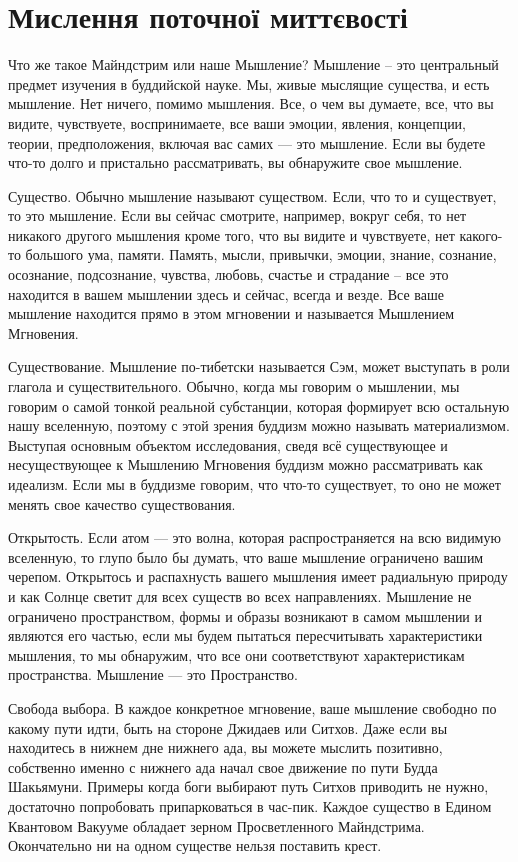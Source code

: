 \section{Мислення поточної миттєвості}

Что же такое Майндстрим или наше Мышление? Мышление – это центральный предмет изучения в буддийской науке. Мы, живые мыслящие существа, и есть мышление. Нет ничего, помимо мышления.  Все, о чем вы думаете, все, что вы видите, чувствуете, воспринимаете, все ваши эмоции, явления, концепции, теории, предположения, включая вас самих — это мышление. Если вы будете что-то долго и пристально рассматривать, вы обнаружите свое мышление. 

Существо. Обычно мышление называют существом. Если, что то и существует, то это мышление. Если вы сейчас смотрите, например, вокруг себя, то нет никакого другого мышления кроме того, что вы видите и чувствуете, нет какого-то большого ума, памяти. Память, мысли, привычки, эмоции, знание, сознание, осознание, подсознание, чувства, любовь, счастье и страдание – все это находится в вашем мышлении здесь и сейчас, всегда и везде. Все ваше мышление находится прямо в этом мгновении и называется Мышлением Мгновения.

Существование. Мышление по-тибетски называется Сэм, может выступать в роли глагола и существительного. Обычно, когда мы говорим о мышлении, мы говорим о самой тонкой реальной субстанции, которая формирует всю остальную нашу вселенную, поэтому с этой зрения буддизм можно называть материализмом. Выступая основным объектом исследования, сведя всё существующее и несуществующее к Мышлению Мгновения буддизм можно рассматривать как идеализм. Если мы в буддизме говорим, что что-то существует, то оно не может менять свое качество существования.

Открытость. Если атом — это волна, которая распространяется на всю видимую вселенную, то глупо было бы думать, что ваше мышление ограничено вашим черепом. Открытось и распахнусть вашего мышления имеет радиальную природу и как Солнце светит для всех существ во всех направлениях. Мышление не ограничено пространством, формы и образы возникают в самом мышлении и являются его частью, если мы будем пытаться пересчитывать характеристики мышления, то мы обнаружим, что все они соответствуют характеристикам пространства. Мышление — это Пространство.

Свобода выбора. В каждое конкретное мгновение, ваше мышление свободно по какому пути идти, быть на стороне Джидаев или Ситхов. Даже если вы находитесь в нижнем дне нижнего ада, вы можете мыслить позитивно, собственно именно с нижнего ада начал свое движение по пути Будда Шакьямуни. Примеры когда боги выбирают путь Ситхов приводить не нужно, достаточно попробовать припарковаться в час-пик. Каждое существо в Едином Квантовом Вакууме обладает зерном Просветленного Майндстрима. Окончательно ни на одном существе нельзя поставить крест.

